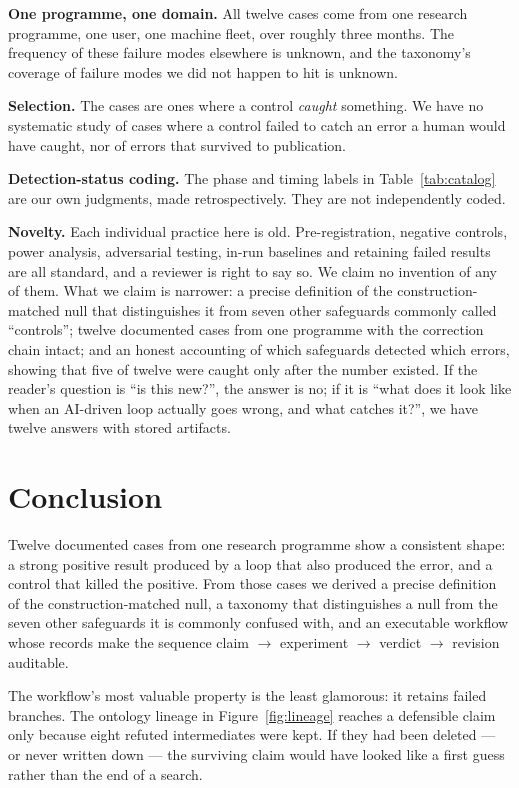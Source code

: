\documentclass[11pt]{article}
\begin{document}
\textbf{One programme, one domain.} All twelve cases come from one
research programme, one user, one machine fleet, over roughly three months.
The frequency of these failure modes elsewhere is unknown, and the
taxonomy's coverage of failure modes we did not happen to hit is unknown.

\textbf{Selection.} The cases are ones where a control \emph{caught}
something. We have no systematic study of cases where a control failed to
catch an error a human would have caught, nor of errors that survived to
publication.

\textbf{Detection-status coding.} The phase and timing labels in
Table~\ref{tab:catalog} are our own judgments, made retrospectively. They
are not independently coded.

\textbf{Novelty.} Each individual practice here is old. Pre-registration,
negative controls, power analysis, adversarial testing, in-run baselines
and retaining failed results are all standard, and a reviewer is right to
say so. We claim no invention of any of them. What we claim is narrower:
a precise definition of the construction-matched null that distinguishes
it from seven other safeguards commonly called ``controls''; twelve
documented cases from one programme with the correction chain intact; and
an honest accounting of which safeguards detected which errors, showing
that five of twelve were caught only after the number existed. If the
reader's question is ``is this new?'', the answer is no; if it is ``what
does it look like when an AI-driven loop actually goes wrong, and what
catches it?'', we have twelve answers with stored artifacts.

\section{Conclusion}

Twelve documented cases from one research programme show a consistent
shape: a strong positive result produced by a loop that also produced the
error, and a control that killed the positive. From those cases we derived
a precise definition of the construction-matched null, a taxonomy that
distinguishes a null from the seven other safeguards it is commonly
confused with, and an executable workflow whose records make the sequence
claim $\rightarrow$ experiment $\rightarrow$ verdict $\rightarrow$
revision auditable.

The workflow's most valuable property is the least glamorous: it retains
failed branches. The ontology lineage in Figure~\ref{fig:lineage} reaches
a defensible claim only because eight refuted intermediates were kept. If
they had been deleted --- or never written down --- the surviving claim
would have looked like a first guess rather than the end of a search.
\end{document}
